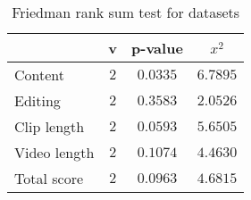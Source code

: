 \begin{table}[ht]
	\begin{center}
	\caption{Friedman rank sum test for datasets}
	\label{tab:fried_dataset}
		\begin{tabular}{lccc}
		\toprule
			 & v & p-value & $x^2$\\
			\midrule
			Content & $2$ & $0.0335$ & $6.7895$\\
			Editing & $2$ & $0.3583$ & $2.0526$\\
			Clip length & $2$ & $0.0593$ & $5.6505$\\
			Video length & $2$ & $0.1074$ & $4.4630$\\
			Total score & $2$ & $0.0963$ & $4.6815$\\
		\bottomrule
		\end{tabular}
	\end{center}
\end{table}